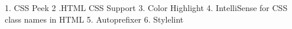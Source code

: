 1. CSS Peek
2 .HTML CSS Support
3. Color Highlight
4. IntelliSense for CSS class names in HTML
5. Autoprefixer
6. Stylelint